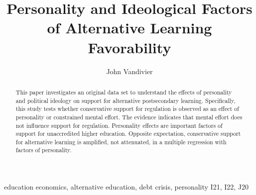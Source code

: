 \documentclass[review]{elsarticle}
\begin{document}
\begin{frontmatter}

    \title{
        Personality and Ideological Factors of Alternative Learning Favorability
    }

    \author[mymainaddress]{John Vandivier} %
    \address[mymainaddress]{4400 University Dr, Fairfax, VA 22030}

    \begin{abstract}
        This paper investigates an original data set to understand
        the effects of personality and political ideology
        on support for alternative postsecondary learning.
        Specifically, this study tests whether conservative support for regulation
        is observed as an effect of personality or constrained mental effort.
        The evidence indicates that mental effort does not influence support for regulation.
        Personality effects are important factors of support for unaccredited higher education.
        Opposite expectation,
        conservative support for alternative learning is amplified,
        not attenuated,
        in a multiple regression with factors of personality.
    \end{abstract}

    \begin{keyword}
        education economics, alternative education, debt crisis, personality
        \MSC[2010] I21, I22, J20 %
    \end{keyword}

\end{frontmatter}
\end{document}
